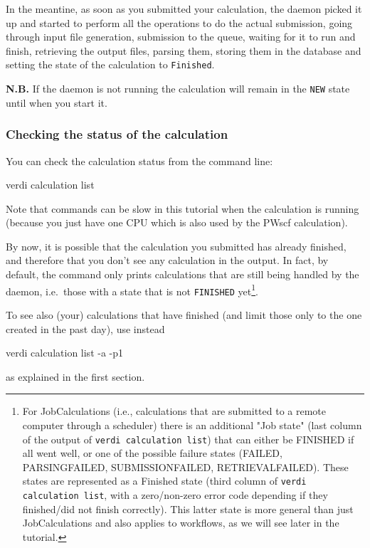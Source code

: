 In the meantine, as soon as you submitted your calculation,  the daemon picked it up
and started to perform all the operations to do the actual submission, going through
input file generation, submission to the queue, waiting for it to run and finish,
retrieving the output files, parsing them, storing them in the database and setting the
state of the calculation to \texttt{Finished}.

\textbf{N.B.} If the daemon is not running the calculation will remain in the \texttt{NEW} state until when you start it.



\subsubsection{Checking the status of the calculation}
You can check the calculation status from the command line:
\begin{bashcommand}
 verdi calculation list                                   
\end{bashcommand}
Note that  commands can be slow in this tutorial when the calculation is running (because you just have one CPU which is also used by the PWscf calculation). 

By now, it is possible that the calculation you submitted has already finished,
and therefore that you don't see any calculation in the output. In fact, 
by default, the command only prints calculations that are still being handled by the daemon, i.e.\ those with a state that is not \texttt{FINISHED} yet\footnote{For JobCalculations (i.e., calculations that are submitted to a remote computer through a scheduler) there is an additional "Job state" (last column of the output of \texttt{verdi calculation list}) that can either be FINISHED if all went well, or one of the possible failure states (FAILED, PARSINGFAILED, SUBMISSIONFAILED, RETRIEVALFAILED). These states are represented as
a Finished state (third column of \texttt{verdi calculation list}, with a zero/non-zero
error code depending if they finished/did not finish correctly). This latter state
is more general than just JobCalculations and also applies to workflows, as we will
see later in the tutorial.}.

To see also (your) calculations that have finished (and limit those only to the one created in the past day), use instead
\begin{bashcommand}
 verdi calculation list -a -p1                                  
\end{bashcommand}
as explained in the first section.

